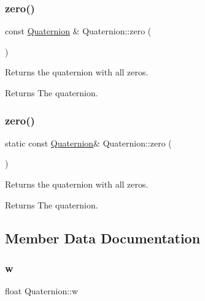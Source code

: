 \subsubsection{\texorpdfstring{zero()}{zero()}\hspace{0.1cm}{\footnotesize\ttfamily [1/2]}}
{\footnotesize\ttfamily const \hyperlink{classQuaternion}{Quaternion} \& Quaternion\+::zero (\begin{DoxyParamCaption}{ }\end{DoxyParamCaption})\hspace{0.3cm}{\ttfamily [static]}}

Returns the quaternion with all zeros.

\begin{DoxyReturn}{Returns}
The quaternion. 
\end{DoxyReturn}
\mbox{\label{classQuaternion_ab43289b15be2b706934d497cfcbe8fbe}} 
\subsubsection{\texorpdfstring{zero()}{zero()}\hspace{0.1cm}{\footnotesize\ttfamily [2/2]}}
{\footnotesize\ttfamily static const \hyperlink{classQuaternion}{Quaternion}\& Quaternion\+::zero (\begin{DoxyParamCaption}{ }\end{DoxyParamCaption})\hspace{0.3cm}{\ttfamily [static]}}

Returns the quaternion with all zeros.

\begin{DoxyReturn}{Returns}
The quaternion. 
\end{DoxyReturn}


\subsection{Member Data Documentation}
\mbox{\label{classQuaternion_aa44a65ab99e36f6ab8771030eed8a7ad}} 
\subsubsection{\texorpdfstring{w}{w}}
{\footnotesize\ttfamily float Quaternion\+::w}

